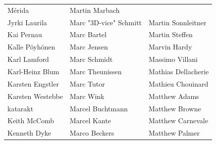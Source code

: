 \begin{small}
\begin{tabular}{p{4cm}p{4cm}p{4cm}}
Mérida & Martin Marbach \\Jyrki Laurila & Marc "3D-vice" Schmitt & Martin Sonnleitner \\Kai Pernau & Marc Bartel & Martin Steffen \\Kalle Pöyhönen & Marc Jensen & Marvin Hardy \\Karl Lamford & Marc Schmidt & Massimo Villani \\Karl-Heinz Blum & Marc Theunissen & Mathias Dellacherie \\Karsten Engstler & Marc Tutor & Mathieu Chouinard \\Karsten Westebbe & Marc Wink & Matthew Adams \\katarakt & Marcel Buchtmann & Matthew Browne \\Keith McComb & Marcel Kante & Matthew Carnevale \\Kenneth Dyke & Marco Beckers & Matthew Palmer \\
\end{tabular}
\newpage
\setlength{\tabcolsep}{1mm}
\begin{tabular}{p{4cm}p{4cm}p{4cm}}

\end{tabular}
\end{small}
